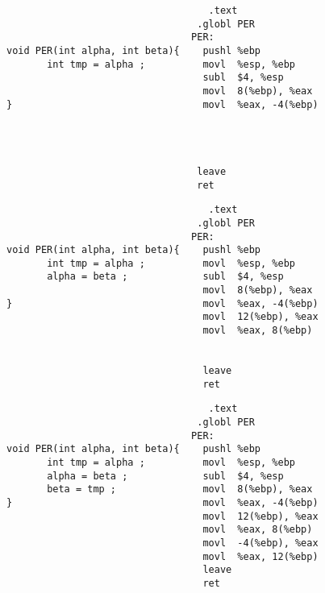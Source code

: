 \begin{frame}[fragile]
\begin{verbatim}
                                   .text                                         
                                 .globl PER           
                                PER:                  
void PER(int alpha, int beta){    pushl %ebp          
       int tmp = alpha ;          movl  %esp, %ebp    
                                  subl  $4, %esp      
                                  movl  8(%ebp), %eax 
}                                 movl  %eax, -4(%ebp)
                              
                              
                              
                              
                                 leave               
                                 ret                 
\end{verbatim}
\end{frame}
\begin{frame}[fragile]
\begin{verbatim}
                                   .text                                         
                                 .globl PER           
                                PER:                  
void PER(int alpha, int beta){    pushl %ebp          
       int tmp = alpha ;          movl  %esp, %ebp    
       alpha = beta ;             subl  $4, %esp      
                                  movl  8(%ebp), %eax 
}                                 movl  %eax, -4(%ebp)
                                  movl  12(%ebp), %eax
                                  movl  %eax, 8(%ebp) 
                           
                           
                                  leave               
                                  ret                 
\end{verbatim}
\end{frame}
\begin{frame}[fragile]
\begin{verbatim}
                                   .text                                         
                                 .globl PER            
                                PER:                   
void PER(int alpha, int beta){    pushl %ebp           
       int tmp = alpha ;          movl  %esp, %ebp      
       alpha = beta ;             subl  $4, %esp       
       beta = tmp ;               movl  8(%ebp), %eax   
}                                 movl  %eax, -4(%ebp)  
                                  movl  12(%ebp), %eax  
                                  movl  %eax, 8(%ebp)  
                                  movl  -4(%ebp), %eax 
                                  movl  %eax, 12(%ebp) 
                                  leave                
                                  ret                  
\end{verbatim}
\end{frame}
